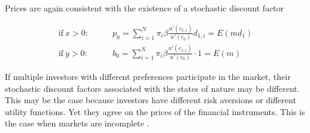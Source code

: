 \bigskip

\noindent Prices are again consistent with the existence of a stochastic discount factor

\begin{align}
    \text{if}\ x>0: \qquad &p_0 = \sum_{i=1}^{N} \pi_i \beta \frac{u'(c_{1,i})}{u'(c_0)} d_{1,i} = E(md_1)\\
    \text{if}\ y>0: \qquad &b_0 = \sum_{i=1}^{N} \pi_i \beta \frac{u'(c_{1,i})}{u'(c_0)} \cdot 1 = E(m)
\end{align}

\bigskip

\noindent If multiple investors with different preferences participate in the market, their stochastic discount factors associated with the states of nature may be different. This may be the case because investors have different risk aversions or different utility functions. Yet they agree on the prices of the financial instruments. This is the case when markets are incomplete \citep{dangl2021notes}. 